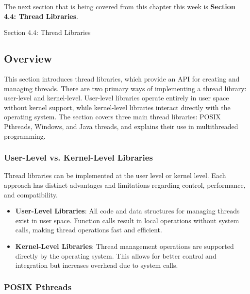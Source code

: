 The next section that is being covered from this chapter this week is \textbf{Section 4.4: Thread Libraries}.

\begin{notes}{Section 4.4: Thread Libraries}
    \subsection*{Overview}

    This section introduces thread libraries, which provide an API for creating and managing threads. There are two primary ways of implementing a thread library: user-level and kernel-level. User-level 
    libraries operate entirely in user space without kernel support, while kernel-level libraries interact directly with the operating system. The section covers three main thread libraries: POSIX Pthreads, 
    Windows, and Java threads, and explains their use in multithreaded programming.
    
    \subsubsection*{User-Level vs. Kernel-Level Libraries}
    
    Thread libraries can be implemented at the user level or kernel level. Each approach has distinct advantages and limitations regarding control, performance, and compatibility.
    
    \begin{highlight}
    
        \begin{itemize}
            \item \textbf{User-Level Libraries}: All code and data structures for managing threads exist in user space. Function calls result in local operations without system calls, making thread operations fast and efficient.
            \item \textbf{Kernel-Level Libraries}: Thread management operations are supported directly by the operating system. This allows for better control and integration but increases overhead due to system calls.
        \end{itemize}
    
    \end{highlight}
    
    \subsubsection*{POSIX Pthreads}
    

\end{notes}
